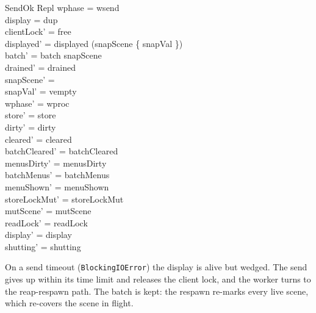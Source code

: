 \documentclass[a4paper,10pt,fleqn]{article}
\begin{document}
\begin{schema}{SendOk}
  \Delta Repl
\where
  wphase = wsend \\
  display = dup \\
  clientLock' = free \\
  displayed' = displayed \oplus (snapScene \cross \{ snapVal \}) \\
  batch' = batch \setminus snapScene \\
  drained' = drained \\
  snapScene' = \emptyset \\
  snapVal' = vempty \\
  wphase' = wproc \\
  store' = store \\
  dirty' = dirty \\
  cleared' = cleared \\
  batchCleared' = batchCleared \\
  menusDirty' = menusDirty \\
  batchMenus' = batchMenus \\
  menuShown' = menuShown \\
  storeLockMut' = storeLockMut \\
  mutScene' = mutScene \\
  readLock' = readLock \\
  display' = display \\
  shutting' = shutting
\end{schema}

On a send timeout (\texttt{BlockingIOError}) the display is alive but
wedged.  The send gives up within its time limit and releases the client
lock, and the worker turns to the reap-respawn path.  The batch is kept:
the respawn re-marks every live scene, which re-covers the scene in flight.
\end{document}
